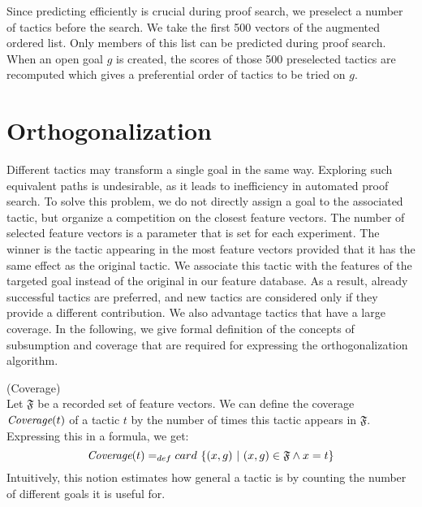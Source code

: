 \documentclass[runningheads,a4paper,draft]{svjour3}
\begin{document}
Since predicting efficiently is crucial during proof 
search, we preselect a number of tactics before the search.
We take the first 500 vectors of the augmented ordered list. Only members of 
this list can be predicted during proof search. When an 
open goal $g$ is created, the scores of those 500 preselected tactics are
recomputed which gives a preferential order of tactics to be tried on $g$.






\section{Orthogonalization}

Different tactics may transform a single goal in the same way. Exploring such 
equivalent paths
is undesirable, as it leads to inefficiency in automated proof search.
To solve this problem, we do not directly assign a goal to the associated 
tactic, but organize a competition on the closest feature vectors. The number 
of selected feature vectors is a parameter that is set for each experiment.
The winner is the tactic appearing in the most feature vectors provided that it 
has the 
same effect as the original tactic. We associate this tactic with the features 
of the targeted goal instead of the original in our feature database. As a 
result, already successful tactics are preferred, and new tactics are 
considered only if they provide a different contribution. We also advantage 
tactics that have a large coverage. In the following, we give formal definition 
of the concepts of subsumption and coverage that are required for expressing 
the orthogonalization algorithm.


\begin{definition} (Coverage)\\ 
Let $\mathfrak{F}$ be a recorded set of feature vectors. We can define the 
coverage $\textit{\mbox{Coverage}}(t)$ of a tactic $t$ by the number of times 
this tactic 
appears in 
$\mathfrak{F}$. Expressing this in a formula, we get:
  \[\textit{\mbox{Coverage}}(t) =_{def} card\ \lbrace (x,g)\ |\ (x,g) \in 
  \mathfrak{F} 
  \wedge x 
  = t
  \rbrace  \]
Intuitively, this notion estimates how general a tactic is by counting the 
number of different goals it is useful for.
\end{definition}
\end{document}
